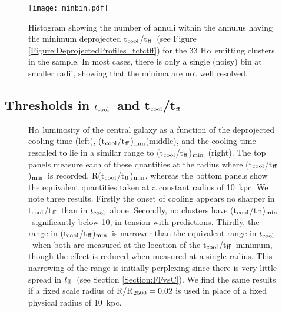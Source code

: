 \documentclass[twocolumn]{aastex6}
\newcommand{\tctff}{{t$_{\rm cool}$/t$_{\rm ff}$}}
\newcommand{\tctffmin}{(\tctff)$_{\rm min}$}
\newcommand{\Rtctffmin}{R(\tctff)$_{\rm min}$}
\newcommand{\tc}{$t_{\rm cool}$}
\newcommand{\tff}{$t_{\rm ff}$}
\begin{document}
\begin{figure}
	\texttt{[image: minbin.pdf]}
    \caption{Histogram showing the number of annuli within the annulus having the minimum deprojected \tctff\ (see Figure \ref{Figure:DeprojectedProfiles_tctctff}) for the 33 H$\alpha$ emitting clusters in the sample.  In most cases, there is only a single (noisy) bin at smaller radii, showing that the minima are not well resolved.}
    \label{Figure:minbin}
\end{figure}


\subsection{Thresholds in \tc\ and \tctff} \label{subsection:Thresholds}

\begin{figure*}    
  \centering   
  \caption{H$\alpha$ luminosity of the central galaxy as a function of the deprojected cooling time (left), \tctffmin (middle), and the cooling time rescaled to lie in a similar range to \tctffmin\ (right).   The top panels measure each of these quantities at the radius where \tctffmin\ is recorded, \Rtctffmin, whereas the bottom panels show the equivalent quantities taken at a constant radius of 10~kpc.  We note three results.  Firstly the onset of cooling appears no sharper in \tctff\ than in \tc\ alone.  Secondly, no clusters have \tctffmin\ significantly below 10, in tension with predictions.  Thirdly, the range in \tctffmin\ is narrower than the equivalent range in \tc\ when both are measured at the location of the \tctff\ minimum, though the effect is reduced when measured at a single radius.  This narrowing of the range is initially perplexing since there is very little spread in \tff\ (see Section \ref{Section:FFvsC}).  We find the same results if a fixed scale radius of R/R$_{\rm 2500} = 0.02$ is used in place of a fixed physical radius of 10~kpc.}
 \label{Figure:Halpha_Plots}
\end{figure*}
\end{document}
